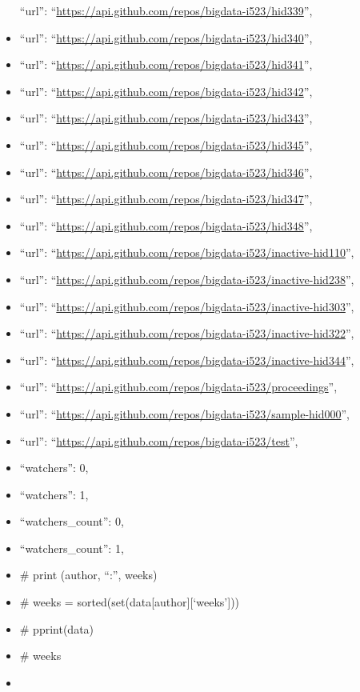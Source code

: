 \begin{itemize}
  ``url'': ``\url{https://api.github.com/repos/bigdata-i523/hid339}'',
\item
  ``url'': ``\url{https://api.github.com/repos/bigdata-i523/hid340}'',
\item
  ``url'': ``\url{https://api.github.com/repos/bigdata-i523/hid341}'',
\item
  ``url'': ``\url{https://api.github.com/repos/bigdata-i523/hid342}'',
\item
  ``url'': ``\url{https://api.github.com/repos/bigdata-i523/hid343}'',
\item
  ``url'': ``\url{https://api.github.com/repos/bigdata-i523/hid345}'',
\item
  ``url'': ``\url{https://api.github.com/repos/bigdata-i523/hid346}'',
\item
  ``url'': ``\url{https://api.github.com/repos/bigdata-i523/hid347}'',
\item
  ``url'': ``\url{https://api.github.com/repos/bigdata-i523/hid348}'',
\item
  ``url'':
  ``\url{https://api.github.com/repos/bigdata-i523/inactive-hid110}'',
\item
  ``url'':
  ``\url{https://api.github.com/repos/bigdata-i523/inactive-hid238}'',
\item
  ``url'':
  ``\url{https://api.github.com/repos/bigdata-i523/inactive-hid303}'',
\item
  ``url'':
  ``\url{https://api.github.com/repos/bigdata-i523/inactive-hid322}'',
\item
  ``url'':
  ``\url{https://api.github.com/repos/bigdata-i523/inactive-hid344}'',
\item
  ``url'':
  ``\url{https://api.github.com/repos/bigdata-i523/proceedings}'',
\item
  ``url'':
  ``\url{https://api.github.com/repos/bigdata-i523/sample-hid000}'',
\item
  ``url'': ``\url{https://api.github.com/repos/bigdata-i523/test}'',
\item
  ``watchers'': 0,
\item
  ``watchers'': 1,
\item
  ``watchers\_count'': 0,
\item
  ``watchers\_count'': 1,
\item
  \# print (author, ``:'', weeks)
\item
  \# weeks = sorted(set(data{[}author{]}{[}`weeks'{]}))
\item
  \# pprint(data)
\item
  \# weeks
\item

\end{itemize}
